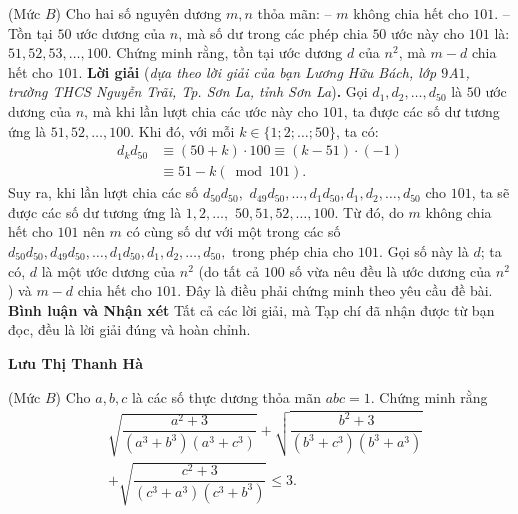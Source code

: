 \begin{multicols}{2}
\begin{flushright}
	\end{flushright}
	{}
	(Mức $B$) Cho hai số nguyên dương $m, n$ thỏa mãn:
	\vskip 0.05cm
	-- $m$ không chia hết cho $101$.
	\vskip 0.05cm
	-- Tồn tại $50$ ước dương của $n$, mà số dư trong các phép chia $50$ ước này cho $101$ là: $51, 52, 53, \ldots, 100.$ 
	\vskip 0.05cm
	Chứng minh rằng, tồn tại ước dương $d$ của $n^2$, mà $m-d$ chia hết cho $101$.
	\vskip 0.05cm
	\textbf{\color{thachthuctoanhoc}Lời giải} (\textit{dựa theo lời giải của bạn Lương Hữu Bách, lớp $9$A$1$, trường THCS Nguyễn Trãi, Tp. Sơn La, tỉnh Sơn La})\textbf{\color{thachthuctoanhoc}.}
	\vskip 0.05cm
	Gọi $d_1, d_2, \ldots, d_{50}$ là $50$ ước dương của $n$, mà khi lần lượt chia các ước này cho $101$, ta được các số dư tương ứng là $51, 52, \ldots, 100$.
	\vskip 0.05cm
	Khi đó, với mỗi $k \in \{1; 2; \ldots; 50\}$, ta có:
	\begin{align*}
		{d_k}{d_{50}} &\equiv \left( {50 + k} \right) \cdot 100 \equiv \left( {k - 51} \right) \cdot \left( { - 1} \right) \\
		&\equiv 51 - k\left( {\bmod 101} \right).
	\end{align*}
	Suy ra, khi lần lượt chia các số  ${d_{50}}{d_{50}},$ ${d_{49}}{d_{50}}, \ldots,{d_1}{d_{50}},d_1, d_2,\ldots,d_{50}$   cho $101$, ta sẽ được các số dư tương ứng là $1, 2,\ldots,$ $50, 51, 52, \ldots, 100$.
	\vskip 0.05cm
	Từ đó, do $m$ không chia hết cho $101$ nên $m$ có cùng số dư với một trong các số  $d_{50}d_{50},d_{49}d_{50}, \ldots,d_1d_{50},d_1,d_2, \ldots,d_{50},$ trong phép chia cho $101$. Gọi số này là $d$; ta có, $d$ là một ước dương của $n^2$ (do tất cả $100$ số vừa nêu đều là ước dương của $n^2$) và $m - d$ chia hết cho $101$. Đây là điều phải chứng minh theo yêu cầu đề bài.
	\vskip 0.05cm
	\textbf{\color{thachthuctoanhoc}Bình luận và Nhận xét}
	\vskip 0.05cm
	Tất cả các lời giải, mà Tạp chí đã nhận được từ bạn đọc, đều là lời giải đúng và hoàn chỉnh.
	\begin{flushright}
		\textbf{\color{thachthuctoanhoc}Lưu Thị Thanh Hà}
	\end{flushright}
	{}
	(Mức $B$) Cho $a, b, c$ là các số thực dương thỏa mãn $a b c=1$. Chứng minh rằng
	\begin{align*}
		&\sqrt{\dfrac{a^2\!+\!3}{\left(a^3\!+\!b^3\right)\!\left(a^3\!+\!c^3\right)}}\!+\!\sqrt{\dfrac{b^2\!+\!3}{\left(b^3\!+\!c^3\right)\!\left(b^3\!+\!a^3\right)}}\\
		&+\sqrt{\dfrac{c^2\!+\!3}{\left(c^3\!+\!a^3\right)\!\left(c^3\!+\!b^3\right)}} \leq 3.

\end{align*}
\end{multicols}
